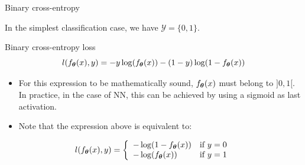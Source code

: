 \documentclass[xcolor=pdftex,dvipsnames,table,mathserif]{beamer}
\begin{document}
\begin{frame}{Binary cross-entropy}

  In the simplest classification case, we have $\mathcal{Y}=\{0, 1\}$.

  \begin{block}{Binary cross-entropy loss}
    \[
    l(f_{\boldsymbol{\theta}}(x), y) = - y \log(f_{\boldsymbol{\theta}}(x)) - (1 - y) \log(1 - f_{\boldsymbol{\theta}}(x))
    \]
  \end{block}

\begin{itemize}
\item   For this expression to be mathematically sound, $f_{\boldsymbol{\theta}}(x)$ must belong to $]0, 1[$. In practice, in the case of NN, this can be achieved by using a sigmoid as last activation.
  \item Note that the expression above is equivalent to:
\end{itemize}

$$
l(f_{\boldsymbol{\theta}}(x), y) = \left\{
    \begin{array}{ll}
        - \log(1 - f_{\boldsymbol{\theta}}(x)) & \mbox{if } y=0 \\
        - \log(f_{\boldsymbol{\theta}}(x)) & \mbox{if } y=1
    \end{array}
\right.
$$


\end{frame}
\end{document}
